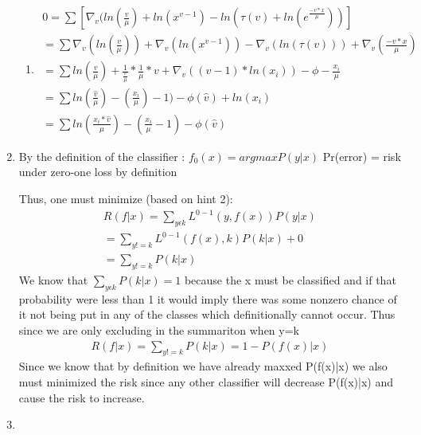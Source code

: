 \documentclass{article}
\begin{document}
\begin{enumerate}
\begin{enumerate}
				\item
				
				\begin{align*}
				 0 = \sum [\nabla_{v}(ln(\frac{v}{\mu}) + ln(x^{v-1}) - ln(\tau(v)+ln(e^{\frac{-v*x}{\mu}}))] \\
				 =  \sum \nabla_{v}(ln(\frac{v}{\mu})) + \nabla_{v}(ln(x^{v-1})) - \nabla_{v}(ln(\tau(v)))+\nabla_{v}(\frac{-v*x}{\mu}) \\
				 = \sum ln(\frac{v}{\mu}) + \frac{1}{\frac{v}{\mu}}*\frac{1}{\mu}*v +\nabla_{v}((v-1)*ln(x_{i}))-\phi-\frac{x_{i}}{\mu} \\
				 = \sum ln(\frac{\hat{v}}{\mu})-(\frac{x_{i}}{\mu})-1)-\phi(\hat{v})+ln(x_{i}) \\
				 = \sum ln(\frac{x_{i}*\hat{v}}{\mu})-(\frac{x_{i}}{\mu}-1)-\phi(\hat{v})
				\end{align*}
				
			\end{enumerate}
			
		\item
			By the definition of the classifier : $f_{0}(x) = arg max P(y|x)$
			Pr(error) = risk under zero-one loss by definition \newline

			Thus, one must minimize (based on hint 2):
			\begin{align*}
			R(f|x) = \sum_{y \epsilon k}L^{0-1}(y, f(x))P(y|x) \\
			= \sum_{y!=k} L^{0-1}(f(x), k)P(k|x) + 0 \\
			= \sum_{y!=k} P(k|x) 				
			\end{align*}
			We know that $\sum_{y \epsilon k} P(k|x)=1$ because the x must be classified and if that probability were less than 1 it would imply there was some nonzero chance of it not being put in any of the classes which definitionally cannot occur. Thus since we are only excluding in the summariton when y=k \newline
			\begin{align}
			R(f|x) = \sum_{y!=k} P(k|x) = 1 - P(f(x)| x)
			\end{align}
			Since we know that by definition we have already maxxed P(f(x)|x) we also must minimized the risk since any other classifier will decrease P(f(x)|x) and cause the risk to increase.
			  
		
		\item
		
		\begin{enumerate}
			

\end{enumerate}
\end{enumerate}
\end{document}
